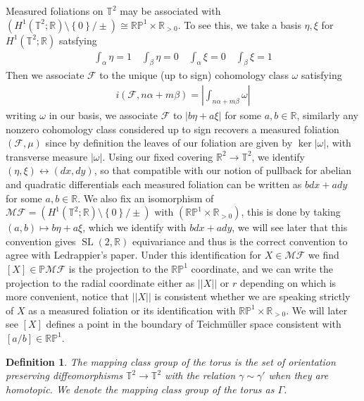 \documentclass{article}
\newtheorem{defn}{Definition}
\newcommand{\set}[1]{\left\{#1\right\}}
\newcommand{\abs}[1]{\left\vert#1\right\vert}
\newcommand{\norm}[1]{\lvert\lvert#1\rvert\rvert}
\begin{document}
        Measured foliations on \(\mathbb{T}^2\) may be associated with \((H^1(\mathbb{T}^2;\mathbb{R}) \setminus \set{0}/\pm) \cong \mathbb{RP}^1 \times \mathbb{R}_{>0}\). To see this, we take a basis \(\eta, \xi\) for \(H^1(\mathbb{T}^2;\mathbb{R})\) satsfying
        \begin{align*}
            \int_\alpha \eta = 1 \quad \int_\beta \eta = 0 \quad \int_\alpha \xi = 0 \quad \int_\beta \xi = 1
        \end{align*}
        Then we associate \(\mathcal{F}\) to the unique (up to sign) cohomology class \(\omega\) satisfying 
        \begin{align*}
            i(\mathcal{F},n \alpha + m \beta) = \abs{\int_{n \alpha + m\beta}\omega}
        \end{align*}
        writing \(\omega\) in our basis, we associate \(\mathcal{F}\) to \(\abs{b\eta + a\xi}\) for some \(a,b \in \mathbb{R}\), similarly any nonzero cohomology class considered up to sign recovers a measured foliation \((\mathcal{F},\mu)\) since by definition the leaves of our foliation are given by \(\ker |\omega|\), with transverse measure \(\abs{\omega}\). Using our fixed covering \(\mathbb{R}^2 \to \mathbb{T}^2\), we identify \((\eta,\xi) \longleftrightarrow (dx,dy)\), so that compatible with our notion of pullback for abelian and quadratic differentials each measured foliation can be written as \(bdx + ady\) for some \(a,b \in \mathbb{R}\). We also fix an isomorphism of \(\mathscr{MF} = (H^1(\mathbb{T}^2;\mathbb{R}) \setminus \set{0}/\pm) \text{ with } (\mathbb{RP}^1 \times \mathbb{R}_{>0})\), this is done by taking \((a,b) \mapsto b\eta + a\xi\), which we identify with \(bdx + ady\), we will see later that this convention gives \(\operatorname{SL}(2,\mathbb{R})\) equivariance and thus is the correct convention to agree with Ledrappier's paper. Under this identification for \(X \in \mathscr{MF}\) we find \([X] \in \mathbb{P}\mathscr{MF}\) is the projection to the \(\mathbb{RP}^1\) coordinate, and we can write the projection to the radial coordinate either as \(\norm{X}\) or \(r\) depending on which is more convenient, notice that \(\norm{X}\) is consistent whether we are speaking strictly of \(X\) as a measured foliation or its identification with \(\mathbb{RP}^1 \times \mathbb{R}_{>0}\). We will later see \([X]\) defines a point in the boundary of Teichm\"uller space consistent with \([a/b] \in \mathbb{RP}^1\).

        \begin{defn}
            The mapping class group of the torus is the set of orientation preserving diffeomorphisms \(\mathbb{T}^2 \to \mathbb{T}^2\) with the relation \(\gamma \sim \gamma'\) when they are homotopic. We denote the mapping class group of the torus as \(\Gamma\).
        \end{defn}
\end{document}
